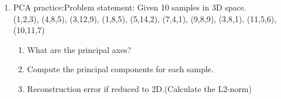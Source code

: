 \documentclass[12pt, a4paper]{article}
\begin{document}
\begin{enumerate}
\begin{enumerate}
\end{enumerate}

\item PCA practice:Problem statement: Given 10 samples in 3D space.\\
(1,2,3), (4,8,5), (3,12,9), (1,8,5), (5,14,2), (7,4,1), (9,8,9), (3,8,1), (11,5,6), (10,11,7)\\
\begin{enumerate}
    \item What are the principal axes?\\

    \item Compute the principal components for each sample.\\

    \item Reconstruction error if reduced to 2D.(Calculate the L2-norm)\\

\end{enumerate}

\end{enumerate}
\end{document}
